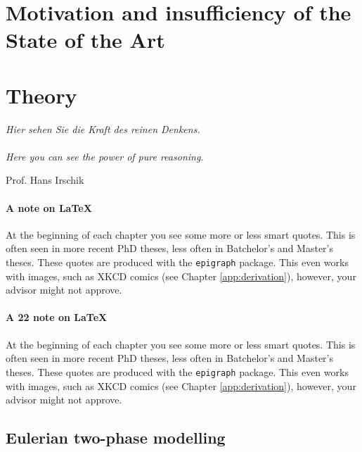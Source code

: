 
\chapter{Motivation and insufficiency of the State of the Art}
\label{cap:insufficiency}
\lipsum[1]

\chapter{Theory}
\label{sec:theory}

\epigraph{
	\textit{Hier sehen Sie die Kraft des reinen Denkens.} \\
	\hspace{1ex}\\
	\textit{Here you can see the power of pure reasoning.}
}{Prof. Hans Irschik}
		



\subsubsection*{A note on \LaTeX{}}

At the beginning of each chapter you see some more or less smart quotes. This is often seen 
in more recent PhD theses, less often in Batchelor's and Master's theses. These quotes are 
produced with the \verb+epigraph+ package. This even works with images, such as XKCD comics 
(see Chapter \ref{app:derivation}), however, your advisor might not approve.

\subsubsection*{A 22 note on \LaTeX{}}

At the beginning of each chapter you see some more or less smart quotes. This is often seen 
in more recent PhD theses, less often in Batchelor's and Master's theses. These quotes are 
produced with the \verb+epigraph+ package. This even works with images, such as XKCD comics 
(see Chapter \ref{app:derivation}), however, your advisor might not approve.

\section{Eulerian two-phase modelling}

